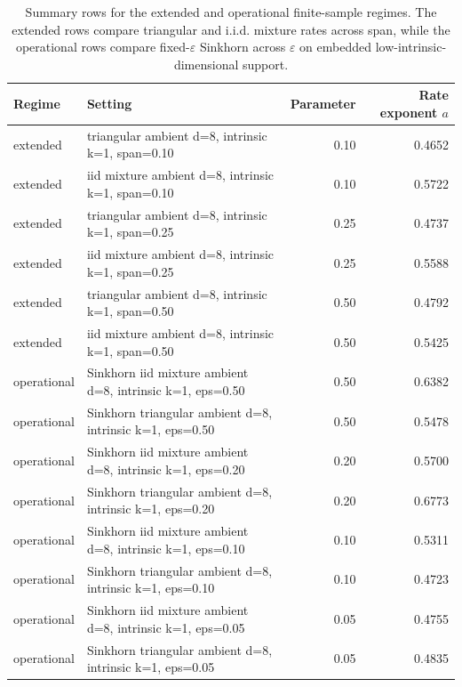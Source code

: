 \begin{table}[!htbp]
\centering
\small
\caption{Summary rows for the extended and operational finite-sample regimes. The extended rows compare triangular and i.i.d. mixture rates across span, while the operational rows compare fixed-$\varepsilon$ Sinkhorn across $\varepsilon$ on embedded low-intrinsic-dimensional support.}
\label{tab:finite_sample_regimes_legacy}
\begin{tabular}{llrr}
\toprule
Regime & Setting & Parameter & Rate exponent $a$ \\
\midrule
extended & triangular ambient d=8, intrinsic k=1, span=0.10 & 0.10 & 0.4652 \\
extended & iid mixture ambient d=8, intrinsic k=1, span=0.10 & 0.10 & 0.5722 \\
extended & triangular ambient d=8, intrinsic k=1, span=0.25 & 0.25 & 0.4737 \\
extended & iid mixture ambient d=8, intrinsic k=1, span=0.25 & 0.25 & 0.5588 \\
extended & triangular ambient d=8, intrinsic k=1, span=0.50 & 0.50 & 0.4792 \\
extended & iid mixture ambient d=8, intrinsic k=1, span=0.50 & 0.50 & 0.5425 \\
operational & Sinkhorn iid mixture ambient d=8, intrinsic k=1, eps=0.50 & 0.50 & 0.6382 \\
operational & Sinkhorn triangular ambient d=8, intrinsic k=1, eps=0.50 & 0.50 & 0.5478 \\
operational & Sinkhorn iid mixture ambient d=8, intrinsic k=1, eps=0.20 & 0.20 & 0.5700 \\
operational & Sinkhorn triangular ambient d=8, intrinsic k=1, eps=0.20 & 0.20 & 0.6773 \\
operational & Sinkhorn iid mixture ambient d=8, intrinsic k=1, eps=0.10 & 0.10 & 0.5311 \\
operational & Sinkhorn triangular ambient d=8, intrinsic k=1, eps=0.10 & 0.10 & 0.4723 \\
operational & Sinkhorn iid mixture ambient d=8, intrinsic k=1, eps=0.05 & 0.05 & 0.4755 \\
operational & Sinkhorn triangular ambient d=8, intrinsic k=1, eps=0.05 & 0.05 & 0.4835 \\
\bottomrule
\end{tabular}
\end{table}
